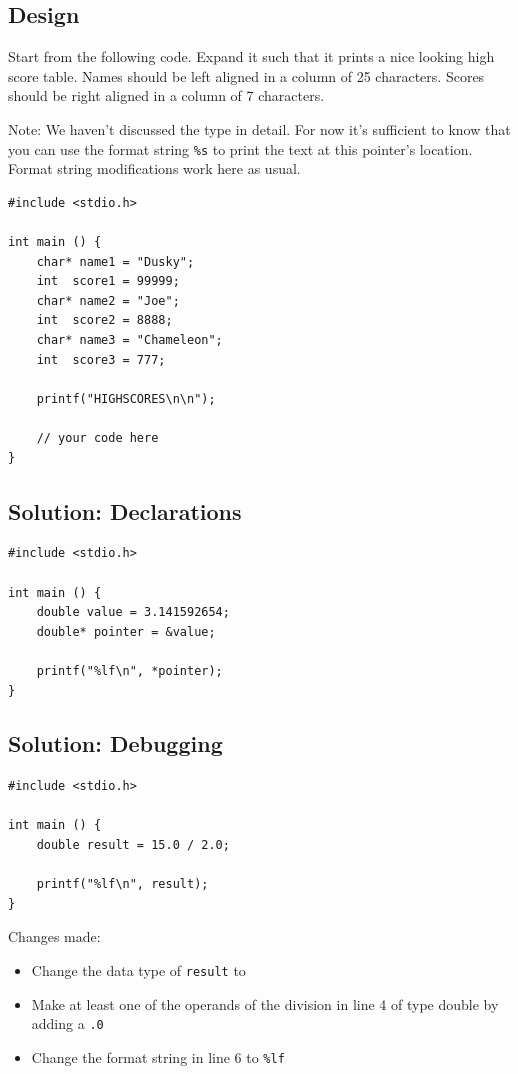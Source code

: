 {{{{\subsection*{Design}
Start from the following code. Expand it such that it prints a nice looking high score table. Names should be left aligned in a column of 25 characters. Scores should be right aligned in a column of 7 characters.

Note:  We haven't discussed the type  in detail. For now it's sufficient to know that you can use the format string \texttt{\%s} to print the text at this pointer's location. Format string modifications work here as usual.
\begin{codebox}[exo3-3.c]
\begin{verbatim}
#include <stdio.h>

int main () {
    char* name1 = "Dusky";
    int  score1 = 99999;
    char* name2 = "Joe";
    int  score2 = 8888;
    char* name3 = "Chameleon";
    int  score3 = 777;
   
    printf("HIGHSCORES\n\n");
    
    // your code here
}
\end{verbatim}
\end{codebox}


\newpage

\subsection*{Solution: Declarations}
\begin{codebox}[exo3-1.c]
\begin{verbatim}
#include <stdio.h>

int main () {
    double value = 3.141592654;
    double* pointer = &value;

    printf("%lf\n", *pointer);
}
\end{verbatim}
\end{codebox}

\subsection*{Solution: Debugging}
\begin{codebox}[exo3-2.c]
\begin{verbatim}
#include <stdio.h>

int main () {
    double result = 15.0 / 2.0;
   
    printf("%lf\n", result);
}
\end{verbatim}
\end{codebox}
Changes made:
\begin{itemize}
\item Change the data type of \texttt{result} to 
\item Make at least one of the operands of the division in line 4 of type double by adding a \texttt{.0}
\item Change the format string in line 6 to \texttt{\%lf}
\end{itemize}

}}}}

